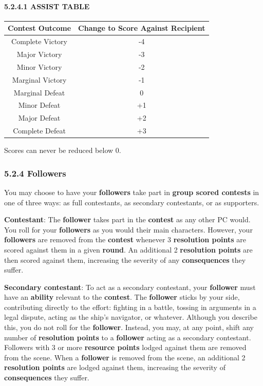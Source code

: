\documentclass[
]{article}
\begin{document}
\hypertarget{assist-table}{%
\paragraph{5.2.4.1 ASSIST TABLE}\label{assist-table}}

\begin{longtable}[]{@{}cc@{}}
\toprule
Contest Outcome & Change to Score Against Recipient\tabularnewline
\midrule
\endhead
Complete Victory & -4\tabularnewline
Major Victory & -3\tabularnewline
Minor Victory & -2\tabularnewline
Marginal Victory & -1\tabularnewline
Marginal Defeat & 0\tabularnewline
Minor Defeat & +1\tabularnewline
Major Defeat & +2\tabularnewline
Complete Defeat & +3\tabularnewline
\bottomrule
\end{longtable}

Scores can never be reduced below 0.

\hypertarget{followers}{%
\subsubsection{5.2.4 Followers}\label{followers}}

You may choose to have your \textbf{followers} take part in
\textbf{group scored contests} in one of three ways: as full
contestants, as secondary contestants, or as supporters.

\textbf{Contestant}: The \textbf{follower} takes part in the
\textbf{contest} as any other PC would. You roll for your
\textbf{followers} as you would their main characters. However, your
\textbf{followers} are removed from the \textbf{contest} whenever 3
\textbf{resolution points} are scored against them in a given
\textbf{round}. An additional 2 \textbf{resolution points} are then
scored against them, increasing the severity of any
\textbf{consequences} they suffer.

\textbf{Secondary contestant}: To act as a secondary contestant, your
\textbf{follower} must have an \textbf{ability} relevant to the
\textbf{contest}. The \textbf{follower} sticks by your side,
contributing directly to the effort: fighting in a battle, tossing in
arguments in a legal dispute, acting as the ship's navigator, or
whatever. Although you describe this, you do not roll for the
\textbf{follower}. Instead, you may, at any point, shift any number of
\textbf{resolution points} to a \textbf{follower} acting as a secondary
contestant. Followers with 3 or more \textbf{resource points} lodged
against them are removed from the scene. When a \textbf{follower} is
removed from the scene, an additional 2 \textbf{resolution points} are
lodged against them, increasing the severity of \textbf{consequences}
they suffer.
\end{document}
